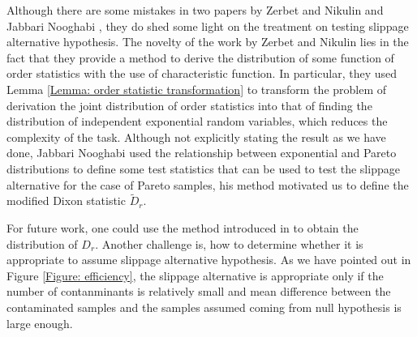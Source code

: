 \documentclass{report}
\begin{document}
Although there are some mistakes in two papers by Zerbet and Nikulin \cite{zerbet2003new} and Jabbari Nooghabi \cite{jabbari2019detecting}, they do
shed some light on the treatment on testing slippage alternative hypothesis. The novelty of the work by Zerbet and Nikulin lies in the fact that they provide a
method to derive the distribution of some function of order statistics with the use of characteristic function. In particular, they used Lemma \ref{Lemma: order statistic transformation}
to transform the problem of derivation the joint distribution of order statistics into that of finding the distribution of independent exponential random variables, which reduces the
complexity of the task. Although not explicitly stating the result as we have done, Jabbari Nooghabi used the relationship between exponential and Pareto distributions to
define some test statistics that can be used to test the slippage alternative for the case of Pareto samples, his method motivated us to define the modified Dixon statistic
$\tilde D_r$.

For future work, one could use the method introduced in \cite{zerbet2003new}
to obtain the distribution of $D_r$. Another challenge is, how to determine whether it is appropriate to
assume slippage alternative hypothesis. As we have pointed out in Figure \ref{Figure: efficiency}, the slippage alternative
is appropriate only if the number of contanminants is relatively small and mean difference between the contaminated samples
and the samples assumed coming from null hypothesis is large enough.




\end{document}

